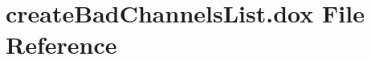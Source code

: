 \hypertarget{create_bad_channels_list_8dox}{\section{create\-Bad\-Channels\-List.\-dox File Reference}
\label{create_bad_channels_list_8dox}
}

